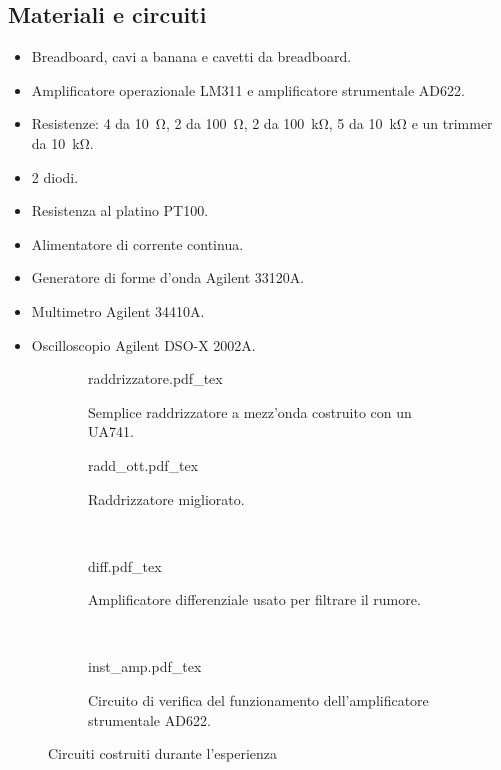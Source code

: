 \subsection{Materiali e circuiti}

\begin{itemize}
    \item{Breadboard, cavi a banana e cavetti da breadboard.}
    \item{Amplificatore operazionale LM311 e amplificatore strumentale AD622.}
    \item{Resistenze: 4 da \SI{10}{\ohm}, 2 da \SI{100}{\ohm}, 2 da \SI{100}{\kilo\ohm}, 5 da \SI{10}{\kilo\ohm} e
        un trimmer da \SI{10}{\kilo\ohm}.}
    \item{2 diodi.}
    \item{Resistenza al platino PT100.}
    \item{Alimentatore di corrente continua.}
    \item{Generatore di forme d'onda Agilent 33120A.}
    \item{Multimetro Agilent 34410A.}
    \item{Oscilloscopio Agilent DSO-X 2002A.}
\end{itemize}

\begin{figure*}[b!]
        \centering
        \small
        \begin{subfigure}[b]{0.43\textwidth}
            \def\svgwidth{\columnwidth}
            {raddrizzatore.pdf_tex}
            \caption{Semplice raddrizzatore a mezz'onda costruito con un UA741.}
            \label{fig:raddrizzatore5}
        \end{subfigure}
        \quad
        \begin{subfigure}[b]{0.53\textwidth}
            \def\svgwidth{\columnwidth}
            {radd_ott.pdf_tex}
            \caption{Raddrizzatore migliorato.}
            \label{fig:rad_ott5}
        \end{subfigure}
        ~
        \begin{subfigure}[b]{0.48\textwidth}
            \def\svgwidth{\columnwidth}
            {diff.pdf_tex}
            \caption{Amplificatore differenziale usato per filtrare il rumore.}
            \label{fig:diff5}
        \end{subfigure}
        ~
        \begin{subfigure}[b]{0.48\textwidth}
            \def\svgwidth{\columnwidth}
            {inst_amp.pdf_tex}
            \caption{Circuito di verifica del funzionamento dell'amplificatore strumentale AD622.}
            \label{fig:inst_amp5}
        \end{subfigure}

        \caption{Circuiti costruiti durante l'esperienza}
        \label{fig:circuits5}
\end{figure*}
